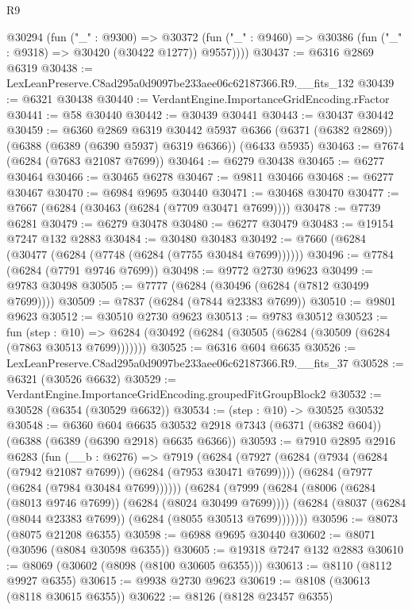 \begin{lexlean}{R9}
\begin{coremodule}
      @30294
        (fun ("_" : @9300) =>
        @30372 (fun ("_" : @9460) => @30386 (fun ("_" : @9318) => @30420 (@30422 @1277)) @9557))))
@30437 := @6316 @2869 @6319
@30438 := LexLeanPreserve.C8ad295a0d9097be233aee06c62187366.R9.__fits_132
@30439 := @6321 @30438
@30440 := VerdantEngine.ImportanceGridEncoding.rFactor
@30441 := @58 @30440
@30442 := @30439 @30441
@30443 := @30437 @30442
@30459 := @6360
    @2869
    @6319
    @30442
    @5937
    @6366
    (@6371 (@6382 @2869))
    (@6388 (@6389 (@6390 @5937) @6319 @6366))
    (@6433 @5935)
@30463 := @7674 (@6284 (@7683 @21087 @7699))
@30464 := @6279 @30438
@30465 := @6277 @30464
@30466 := @30465 @6278
@30467 := @9811 @30466
@30468 := @6277 @30467
@30470 := @6984 @9695 @30440
@30471 := @30468 @30470
@30477 := @7667 (@6284 (@30463 (@6284 (@7709 @30471 @7699))))
@30478 := @7739 @6281
@30479 := @6279 @30478
@30480 := @6277 @30479
@30483 := @19154 @7247 @132 @2883
@30484 := @30480 @30483
@30492 := @7660 (@6284 (@30477 (@6284 (@7748 (@6284 (@7755 @30484 @7699))))))
@30496 := @7784 (@6284 (@7791 @9746 @7699))
@30498 := @9772 @2730 @9623
@30499 := @9783 @30498
@30505 := @7777 (@6284 (@30496 (@6284 (@7812 @30499 @7699))))
@30509 := @7837 (@6284 (@7844 @23383 @7699))
@30510 := @9801 @9623
@30512 := @30510 @2730 @9623
@30513 := @9783 @30512
@30523 := fun (step : @10) =>
  @6284 (@30492 (@6284 (@30505 (@6284 (@30509 (@6284 (@7863 @30513 @7699)))))))
@30525 := @6316 @604 @6635
@30526 := LexLeanPreserve.C8ad295a0d9097be233aee06c62187366.R9.__fits_37
@30528 := @6321 (@30526 @6632)
@30529 := VerdantEngine.ImportanceGridEncoding.groupedFitGroupBlock2
@30532 := @30528 (@6354 (@30529 @6632))
@30534 := (step : @10) -> @30525 @30532
@30548 := @6360
    @604
    @6635
    @30532
    @2918
    @7343
    (@6371 (@6382 @604))
    (@6388 (@6389 (@6390 @2918) @6635 @6366))
@30593 := @7910
    @2895
    @2916
    @6283
    (fun (__b : @6276) =>
    @7919
      (@6284
        (@7927
          (@6284 (@7934 (@6284 (@7942 @21087 @7699)) (@6284 (@7953 @30471 @7699))))
          (@6284 (@7977 (@6284 (@7984 @30484 @7699))))))
      (@6284
        (@7999
          (@6284 (@8006 (@6284 (@8013 @9746 @7699)) (@6284 (@8024 @30499 @7699))))
          (@6284 (@8037 (@6284 (@8044 @23383 @7699)) (@6284 (@8055 @30513 @7699)))))))
@30596 := @8073 (@8075 @21208 @6355)
@30598 := @6988 @9695 @30440
@30602 := @8071 (@30596 (@8084 @30598 @6355))
@30605 := @19318 @7247 @132 @2883
@30610 := @8069 (@30602 (@8098 (@8100 @30605 @6355)))
@30613 := @8110 (@8112 @9927 @6355)
@30615 := @9938 @2730 @9623
@30619 := @8108 (@30613 (@8118 @30615 @6355))
@30622 := @8126 (@8128 @23457 @6355)

\end{coremodule}
\end{lexlean}
